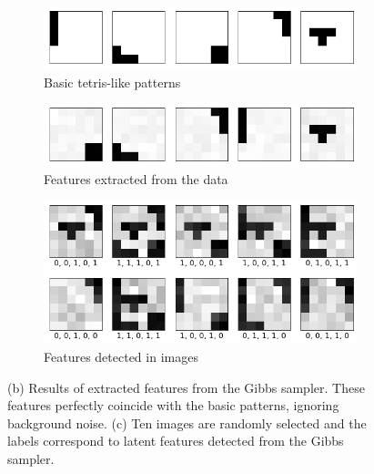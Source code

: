 \documentclass{article}
\begin{document}
\begin{figure}[!h]
  \centering
  \begin{subfigure}[b]{\textwidth}
    \centering
    \includegraphics[width = 9.5cm]{figures/tetris.png}
    \caption{Basic tetris-like patterns}
    \label{fig::tetris}
  \end{subfigure}
  \begin{subfigure}[b]{\textwidth}
    \centering
    \includegraphics[width = 9.5cm]{figures/tetrisfeature.png}
    \caption{Features extracted from the data}
    \label{fig::tetrisfeature}
  \end{subfigure}
  \begin{subfigure}[b]{\textwidth}
    \centering
    \includegraphics[width = 9.5cm]{figures/tetrisdetection.png}
    \caption{Features detected in images} 
    \label{fig::tetrisfeature}
  \end{subfigure}
  \caption{(b) Results of extracted features from the Gibbs sampler. These features perfectly coincide with the basic patterns, ignoring background noise. (c) Ten images are randomly selected and the labels correspond to latent features detected from the Gibbs sampler.}
\end{figure}
\end{document}
